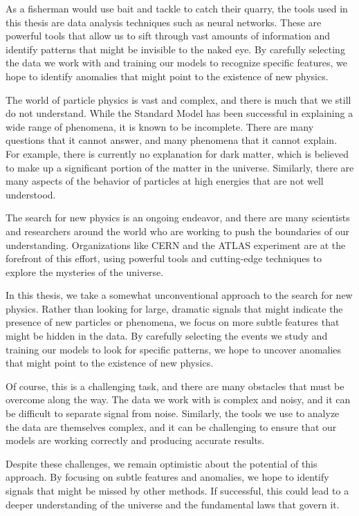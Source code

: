 As a fisherman would use bait and tackle to catch their quarry, the tools used in this thesis are data analysis techniques such as neural networks. These are powerful tools that allow us to sift through vast amounts of information and identify patterns that might be invisible to the naked eye. By carefully selecting the data we work with and training our models to recognize specific features, we hope to identify anomalies that might point to the existence of new physics.

The world of particle physics is vast and complex, and there is much that we still do not understand. While the Standard Model has been successful in explaining a wide range of phenomena, it is known to be incomplete. There are many questions that it cannot answer, and many phenomena that it cannot explain. For example, there is currently no explanation for dark matter, which is believed to make up a significant portion of the matter in the universe. Similarly, there are many aspects of the behavior of particles at high energies that are not well understood.

The search for new physics is an ongoing endeavor, and there are many scientists and researchers around the world who are working to push the boundaries of our understanding. Organizations like CERN and the ATLAS experiment are at the forefront of this effort, using powerful tools and cutting-edge techniques to explore the mysteries of the universe.

In this thesis, we take a somewhat unconventional approach to the search for new physics. Rather than looking for large, dramatic signals that might indicate the presence of new particles or phenomena, we focus on more subtle features that might be hidden in the data. By carefully selecting the events we study and training our models to look for specific patterns, we hope to uncover anomalies that might point to the existence of new physics.

Of course, this is a challenging task, and there are many obstacles that must be overcome along the way. The data we work with is complex and noisy, and it can be difficult to separate signal from noise. Similarly, the tools we use to analyze the data are themselves complex, and it can be challenging to ensure that our models are working correctly and producing accurate results.

Despite these challenges, we remain optimistic about the potential of this approach. By focusing on subtle features and anomalies, we hope to identify signals that might be missed by other methods. If successful, this could lead to a deeper understanding of the universe and the fundamental laws that govern it.

